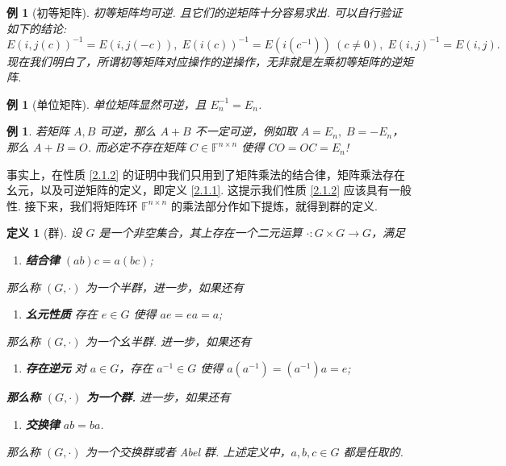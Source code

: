 \documentclass[10pt,openany]{article}
\theoremstyle{thmstyle} %
\theoremstyle{defstyle} %
\newtheorem{definition}[theorem]{定义}
\theoremstyle{prostyle} %
\theoremstyle{exastyle}
\newtheorem{example}[theorem]{例}
\theoremstyle{remstyle}
\newcommand{\F}{\mathbb{F}}
\newcommand{\n}{^{n \times n}}
\begin{document}
\begin{example}[初等矩阵]
	初等矩阵均可逆. 且它们的逆矩阵十分容易求出. 可以自行验证如下的结论:
	\[ E(i,j(c))^{-1}=E(i,j(-c)), \; E(i(c))^{-1}=E(i(c^{-1})) \ (c \neq 0), \; E(i,j)^{-1}=E(i,j). \]
	现在我们明白了，所谓初等矩阵对应操作的逆操作，无非就是左乘初等矩阵的逆矩阵.
	\label{2.1.3}
\end{example}

\begin{example}[单位矩阵]
	单位矩阵显然可逆，且 \( E_n^{-1}=E_n \).
\end{example}

\begin{example}
	若矩阵 \( A,B \) 可逆，那么 \( A+B \) 不一定可逆，例如取 \( A=E_n, \; B=-E_n \)，那么 \( A+B=O \). 而必定不存在矩阵 \( C \in \F\n \) 使得 \( CO=OC=E_n \)!
	\label{2.1.5}
\end{example}

事实上，在性质 \ref{2.1.2} 的证明中我们只用到了矩阵乘法的结合律，矩阵乘法存在幺元，以及可逆矩阵的定义，即定义 \ref{2.1.1}. 这提示我们性质 \ref{2.1.2} 应该具有一般性. 接下来，我们将矩阵环 \( \F\n \) 的乘法部分作如下提炼，就得到群的定义.

\begin{definition}[群]
	设 \( G \) 是一个非空集合，其上存在一个二元运算 \( \cdot: G \times G \to G \)，满足
	\begin{enumerate}
		\item[(1)] \textbf{结合律} \( (ab)c=a(bc) \);
	\end{enumerate}
	那么称 \( (G,\cdot) \) 为一个半群，进一步，如果还有
	\begin{enumerate}
		\item[(2)] \textbf{幺元性质} 存在 \( e \in G \) 使得 \( ae=ea=a \);
	\end{enumerate}
	那么称 \( (G,\cdot) \) 为一个幺半群. 进一步，如果还有
	\begin{enumerate}
		\item[(3)] \textbf{存在逆元} 对 \( a \in G \)，存在 \( a^{-1} \in G \) 使得 \( a(a^{-1})=(a^{-1})a=e \);
	\end{enumerate}
	\textbf{那么称 \( (G,\cdot) \) 为一个群. } 进一步，如果还有
	\begin{enumerate}
		\item[(4)] \textbf{交换律} \( ab=ba \).
	\end{enumerate}
	那么称 \( (G,\cdot) \) 为一个交换群或者 Abel 群. 上述定义中，\( a,b,c \in G \) 都是任取的.
\end{definition}
\end{document}
